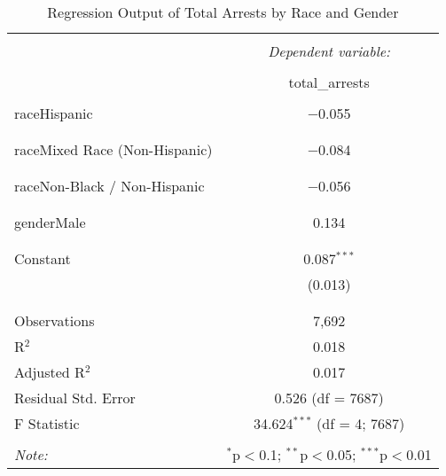 
\begin{table}[!htbp] \centering 
  \caption{Regression Output of Total Arrests by Race and Gender} 
  \label{} 
\begin{tabular}{@{\extracolsep{5pt}}lc} 
\\[-1.8ex]\hline 
\hline \\[-1.8ex] 
 & \multicolumn{1}{c}{\textit{Dependent variable:}} \\ 
\cline{2-2} 
\\[-1.8ex] & total\_arrests \\ 
\hline \\[-1.8ex] 
 raceHispanic & $-$0.055 \\ 
  &  \\ 
  & \\ 
 raceMixed Race (Non-Hispanic) & $-$0.084 \\ 
  &  \\ 
  & \\ 
 raceNon-Black / Non-Hispanic & $-$0.056 \\ 
  &  \\ 
  & \\ 
 genderMale & 0.134 \\ 
  &  \\ 
  & \\ 
 Constant & 0.087$^{***}$ \\ 
  & (0.013) \\ 
  & \\ 
\hline \\[-1.8ex] 
Observations & 7,692 \\ 
R$^{2}$ & 0.018 \\ 
Adjusted R$^{2}$ & 0.017 \\ 
Residual Std. Error & 0.526 (df = 7687) \\ 
F Statistic & 34.624$^{***}$ (df = 4; 7687) \\ 
\hline 
\hline \\[-1.8ex] 
\textit{Note:}  & \multicolumn{1}{r}{$^{*}$p$<$0.1; $^{**}$p$<$0.05; $^{***}$p$<$0.01} \\ 
\end{tabular} 
\end{table} 
